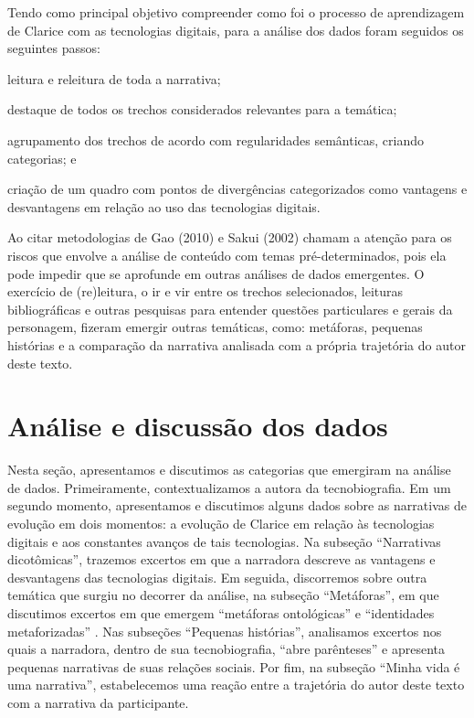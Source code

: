 \documentclass{textolivre-html}
\begin{document}
Tendo como principal objetivo compreender como foi o processo de aprendizagem de Clarice com as tecnologias digitais, para a análise dos dados foram seguidos os seguintes passos: 
\begin{enumerate*}[label=\itshape\arabic*\upshape)]
\item leitura e releitura de toda a narrativa; 
\item destaque de todos os trechos considerados relevantes para a temática; 
\item agrupamento dos trechos de acordo com regularidades semânticas, criando categorias; e 
\item criação de um quadro com pontos de divergências categorizados como vantagens e desvantagens em relação ao uso das tecnologias digitais.
\end{enumerate*}

Ao citar metodologias de Gao (2010) e Sakui (2002) \textcite{barkuizen2014} chamam a atenção para os riscos que envolve a análise de conteúdo com temas pré-determinados, pois ela pode impedir que se aprofunde em outras análises de dados emergentes. O exercício de (re)leitura, o ir e vir entre os trechos selecionados, leituras bibliográficas e outras pesquisas para entender questões particulares e gerais da personagem, fizeram emergir outras temáticas, como: metáforas, pequenas histórias e a comparação da narrativa analisada com a própria trajetória do autor deste texto.

\section{Análise e discussão dos dados}\label{sec-analise}
Nesta seção, apresentamos e discutimos as categorias que emergiram na análise de dados. Primeiramente, contextualizamos a autora da tecnobiografia. Em um segundo momento, apresentamos e discutimos alguns dados sobre as narrativas de evolução em dois momentos: a evolução de Clarice em relação às tecnologias digitais e aos constantes avanços de tais tecnologias. Na subseção “Narrativas dicotômicas”, trazemos excertos em que a narradora descreve as vantagens e desvantagens das tecnologias digitais. Em seguida, discorremos sobre outra temática que surgiu no decorrer da análise, na subseção “Metáforas”, em que discutimos excertos em que emergem “metáforas ontológicas” \cite{lakoff1980} e “identidades metaforizadas” \cite{gomes2016}. Nas subseções “Pequenas histórias”, analisamos excertos nos quais a narradora, dentro de sua tecnobiografia, “abre parênteses” e apresenta pequenas narrativas de suas relações sociais. Por fim, na subseção “Minha vida é uma narrativa”, estabelecemos uma reação entre a trajetória do autor deste texto com a narrativa da participante.
\end{document}

